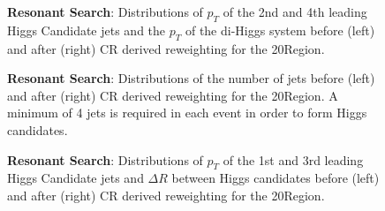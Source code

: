 {\begin{figure}[ht]
	    \caption{\textbf{Resonant Search}: Distributions of $p_{T}$ of the 2nd and 4th leading Higgs Candidate jets and the $p_{T}$ of the di-Higgs system before (left) and after (right) CR derived reweighting for the 20\yr\space \region\space Region.
	    \label{fig:res-\region\yr-2}}
	\end{figure}

	\begin{figure}[ht]
	    \centering
	    \caption{\textbf{Resonant Search}: Distributions of the number of jets before (left) and after (right) CR derived reweighting for the 20\yr\space \region\space Region. A minimum of 4 jets is required in each event in order to form Higgs candidates.
	    \label{fig:res-\region\yr-njet}}
	\end{figure}

	\begin{figure}[ht]
	    \centering


	    \caption{\textbf{Resonant Search}: Distributions of $p_{T}$ of the 1st and 3rd leading Higgs Candidate jets and $\Delta R$ between Higgs candidates before (left) and after (right) CR derived reweighting for the 20\yr\space \region\space Region.
	    \label{fig:res-\region\yr-3}}
	\end{figure}

}
